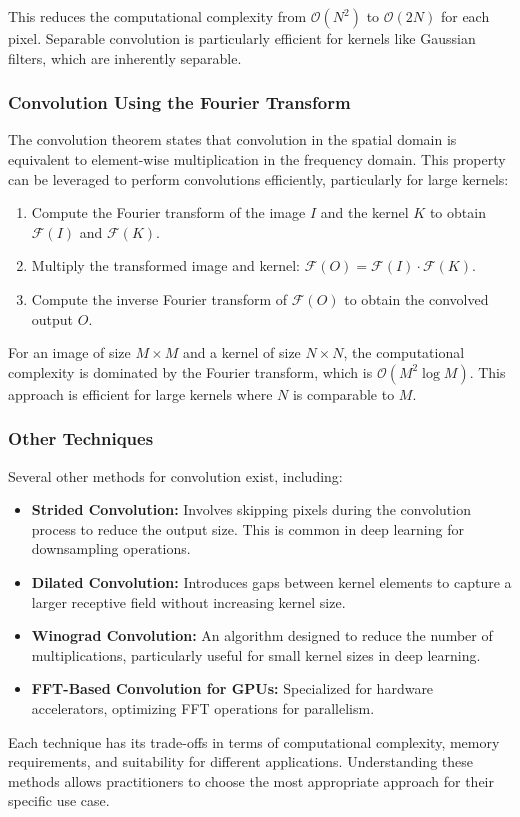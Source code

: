\documentclass[11pt]{book}
\begin{document}
This reduces the computational complexity from $\mathcal{O}(N^2)$ to $\mathcal{O}(2N)$ for each pixel. Separable convolution is particularly efficient for kernels like Gaussian filters, which are inherently separable.

\subsubsection{Convolution Using the Fourier Transform}
The convolution theorem states that convolution in the spatial domain is equivalent to element-wise multiplication in the frequency domain. This property can be leveraged to perform convolutions efficiently, particularly for large kernels:
\begin{enumerate}
    \item Compute the Fourier transform of the image $I$ and the kernel $K$ to obtain $\mathcal{F}(I)$ and $\mathcal{F}(K)$.
    \item Multiply the transformed image and kernel: $\mathcal{F}(O) = \mathcal{F}(I) \cdot \mathcal{F}(K)$.
    \item Compute the inverse Fourier transform of $\mathcal{F}(O)$ to obtain the convolved output $O$.
\end{enumerate}

For an image of size $M \times M$ and a kernel of size $N \times N$, the computational complexity is dominated by the Fourier transform, which is $\mathcal{O}(M^2 \log M)$. This approach is efficient for large kernels where $N$ is comparable to $M$.

\subsubsection{Other Techniques}
Several other methods for convolution exist, including:
\begin{itemize}
    \item \textbf{Strided Convolution:} Involves skipping pixels during the convolution process to reduce the output size. This is common in deep learning for downsampling operations.
    \item \textbf{Dilated Convolution:} Introduces gaps between kernel elements to capture a larger receptive field without increasing kernel size.
    \item \textbf{Winograd Convolution:} An algorithm designed to reduce the number of multiplications, particularly useful for small kernel sizes in deep learning.
    \item \textbf{FFT-Based Convolution for GPUs:} Specialized for hardware accelerators, optimizing FFT operations for parallelism.
\end{itemize}

Each technique has its trade-offs in terms of computational complexity, memory requirements, and suitability for different applications. Understanding these methods allows practitioners to choose the most appropriate approach for their specific use case.



\backmatter
\end{document}

